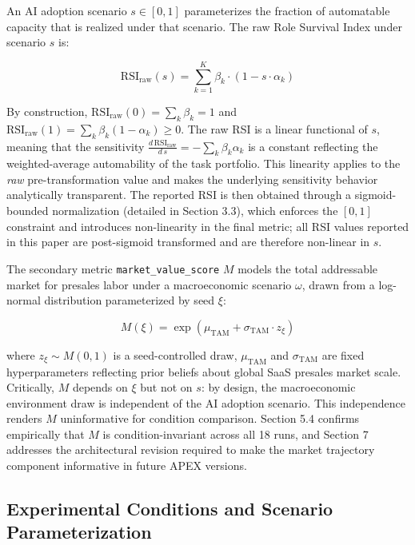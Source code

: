 \documentclass[10pt, conference]{IEEEtran}
\begin{document}
An AI adoption scenario $s \in [0,1]$ parameterizes the fraction of automatable capacity that is realized under that scenario. The raw Role Survival Index under scenario $s$ is:

\begin{equation}
\text{RSI}_{\text{raw}}(s) = \sum_{k=1}^{K} \beta_k \cdot \left(1 - s \cdot \alpha_k\right)
\end{equation}

By construction, $\text{RSI}_{\text{raw}}(0) = \sum_k \beta_k = 1$ and $\text{RSI}_{\text{raw}}(1) = \sum_k \beta_k (1 - \alpha_k) \geq 0$. The raw RSI is a linear functional of $s$, meaning that the sensitivity $\frac{d\,\text{RSI}_{\text{raw}}}{d\,s} = -\sum_k \beta_k \alpha_k$ is a constant reflecting the weighted-average automability of the task portfolio. This linearity applies to the \textit{raw} pre-transformation value and makes the underlying sensitivity behavior analytically transparent. The reported RSI is then obtained through a sigmoid-bounded normalization (detailed in Section 3.3), which enforces the $[0,1]$ constraint and introduces non-linearity in the final metric; all RSI values reported in this paper are post-sigmoid transformed and are therefore non-linear in $s$.

The secondary metric \texttt{market\_value\_score} $M$ models the total addressable market for presales labor under a macroeconomic scenario $\omega$, drawn from a log-normal distribution parameterized by seed $\xi$:

\begin{equation}
M(\xi) = \exp\left(\mu_{\text{TAM}} + \sigma_{\text{TAM}} \cdot z_\xi\right)
\end{equation}

where $z_\xi \sim M(0,1)$ is a seed-controlled draw, $\mu_{\text{TAM}}$ and $\sigma_{\text{TAM}}$ are fixed hyperparameters reflecting prior beliefs about global SaaS presales market scale. Critically, $M$ depends on $\xi$ but not on $s$: by design, the macroeconomic environment draw is independent of the AI adoption scenario. This independence renders $M$ uninformative for condition comparison. Section 5.4 confirms empirically that $M$ is condition-invariant across all 18 runs, and Section 7 addresses the architectural revision required to make the market trajectory component informative in future APEX versions.

\subsection{Experimental Conditions and Scenario Parameterization}
\end{document}
